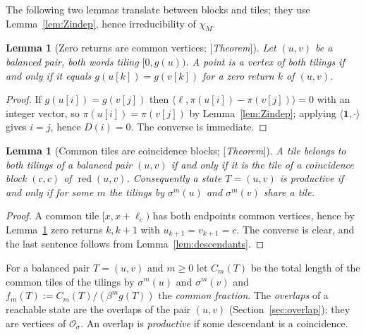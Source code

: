 \documentclass[11pt]{amsart}
\theoremstyle{plain}
\newtheorem{lemma}[theorem]{Lemma}
\theoremstyle{definition}
\theoremstyle{remark}
\newcommand{\red}{\operatorname{red}}
\newcommand{\Status}[1]{\textup{[\textit{#1}]}}
\begin{document}
The following two lemmas translate between blocks and tiles; they use Lemma~\ref{lem:Zindep}, hence irreducibility of $\chi_M$.

\begin{lemma}[Zero returns are common vertices; \Status{Theorem}]\label{lem:common-vertex}
Let $(u,v)$ be a balanced pair, both words tiling $[0,g(u))$. A point is a vertex of both tilings if and only if it equals $g(u[k])=g(v[k])$ for a zero return $k$ of $(u,v)$.
\end{lemma}
\begin{proof}
If $g(u[i])=g(v[j])$ then $\langle\ell,\pi(u[i])-\pi(v[j])\rangle=0$ with an integer vector, so $\pi(u[i])=\pi(v[j])$ by Lemma~\ref{lem:Zindep}; applying $\langle\mathbf 1,\cdot\rangle$ gives $i=j$, hence $D(i)=0$. The converse is immediate.
\end{proof}

\begin{lemma}[Common tiles are coincidence blocks; \Status{Theorem}]\label{lem:common-tile}
A tile belongs to both tilings of a balanced pair $(u,v)$ if and only if it is the tile of a coincidence block $(c,c)$ of $\red(u,v)$. Consequently a state $T=(u,v)$ is productive if and only if for some $m$ the tilings by $\sigma^m(u)$ and $\sigma^m(v)$ share a tile.
\end{lemma}
\begin{proof}
A common tile $[x,x+\ell_c)$ has both endpoints common vertices, hence by Lemma~\ref{lem:common-vertex} zero returns $k,k+1$ with $u_{k+1}=v_{k+1}=c$. The converse is clear, and the last sentence follows from Lemma~\ref{lem:descendants}.
\end{proof}

For a balanced pair $T=(u,v)$ and $m\ge0$ let $C_m(T)$ be the total length of the common tiles of the tilings by $\sigma^m(u)$ and $\sigma^m(v)$ and $f_m(T):=C_m(T)/(\beta^mg(T))$ the \emph{common fraction}. The \emph{overlaps} of a reachable state are the overlaps of the pair $(u,v)$ (Section~\ref{sec:overlap}); they are vertices of $\mathcal O_\sigma$. An overlap is \emph{productive} if some descendant is a coincidence.
\end{document}
